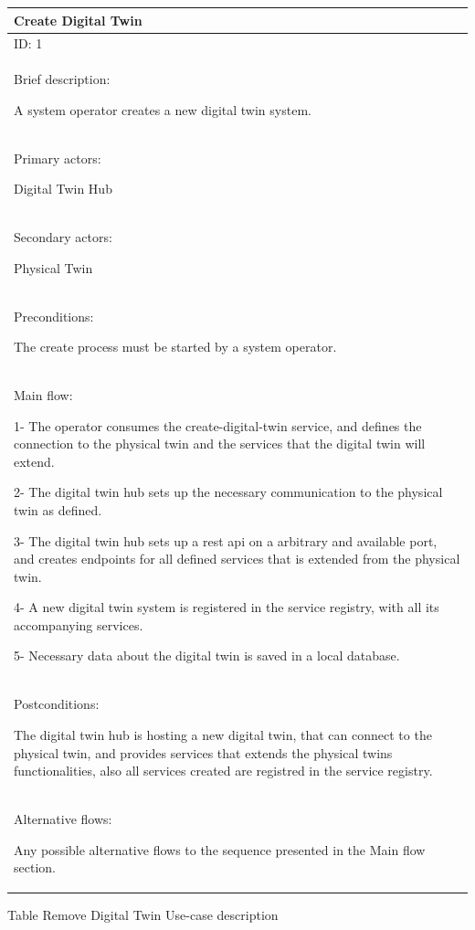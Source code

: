 \documentclass{article}
\newcounter{Table}
\renewcommand\theTable{\arabic{Table}}
\begin{document}
\begin{flushleft}
\tablefirsthead{}
\tablehead{}
\tabletail{}
\tablelasttail{}
\begin{supertabular}{|m{6.01226in}|}
\hline
Create Digital Twin\\\hline
ID: 1 \\\hline
Brief description:

A system operator creates a new digital twin system.\\\hline

Primary actors:

Digital Twin Hub \\\hline
Secondary actors:

Physical Twin \\\hline
Preconditions:

The create process must be started by a system operator. \\\hline
Main flow:

1- The operator consumes the create-digital-twin service, and defines the connection to the physical twin and the services that the digital twin will extend.

2- The digital twin hub sets up the necessary communication to the physical twin as defined.

3- The digital twin hub sets up a rest api on a arbitrary and available port, and creates endpoints for all defined services that is extended from the physical twin. 

4- A new digital twin system is registered in the service registry, with all its accompanying services. 

5- Necessary data about the digital twin is saved in a local database.

\\\hline
Postconditions:

The digital twin hub is hosting a new digital twin, that can connect to the physical twin, and provides services that extends the physical twins functionalities, also all services created are registred in the service registry. \\\hline
Alternative flows:

Any possible alternative flows to the sequence presented in the Main flow section.\\\hline
\end{supertabular}
\end{flushleft}

\newpage

Table \stepcounter{Table}{\theTable} Remove Digital Twin Use-case description
\end{document}
